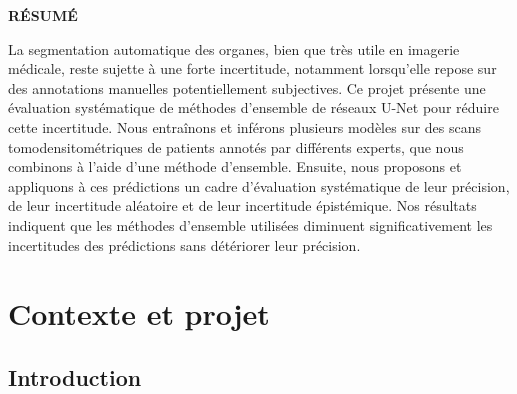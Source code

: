\documentclass[a4paper,french,bookmarks,12pt]{article}
\makeatletter
\renewcommand\tableofcontents{%
    \@starttoc{toc}%
}
\makeatother
\begin{document}
    \medskip

    \begin{center}\sffamily\textbf{RÉSUMÉ}\end{center}
    \medskip
    La segmentation automatique des organes, bien que très utile en imagerie médicale, reste sujette à une forte incertitude, notamment lorsqu’elle repose sur des annotations manuelles potentiellement subjectives. Ce projet présente une évaluation systématique de méthodes d’ensemble de réseaux U-Net pour réduire cette incertitude. Nous entraînons et inférons plusieurs modèles sur des scans tomodensitométriques de patients annotés par différents experts, que nous combinons à l’aide d’une méthode d’ensemble. Ensuite, nous proposons et appliquons à ces prédictions un cadre d’évaluation systématique de leur précision, de leur incertitude aléatoire et de leur incertitude épistémique. Nos résultats indiquent que les méthodes d’ensemble utilisées diminuent significativement les incertitudes des prédictions sans détériorer leur précision.
    \medskip

    \makeatletter
    \renewcommand\tableofcontents{%
        \@starttoc{toc}%
    }
    \makeatother

    \begin{tcolorbox}[
        enhanced,
        frame hidden,
        sharp corners,
        detach title,
        halign=left,
        spread outwards,
        halign              = center,
            valign              = center,
        borderline west     = {3pt}{0pt}{ensae},
        coltitle            = ensae, 
        interior style      = {
            color      = main1white2!65!gray!11
        },
        arc                 = 0 cm,
        title               = SOMMAIRE,
        boxrule             = 0pt,
        fonttitle           = \bfseries\sffamily,
        overlay             = {
            \node[rotate=90, minimum width=1cm, anchor=south,yshift=-0.8cm]
            at (frame.west) {\tcbtitle};
        },
    ]
        \begin{minipage}[t]{0.85\linewidth}
            \scriptsize\sffamily
            \tableofcontents
        \end{minipage}
    \end{tcolorbox}

    \newpage
    \section{Contexte et projet}

    \subsection{Introduction}
\end{document}
